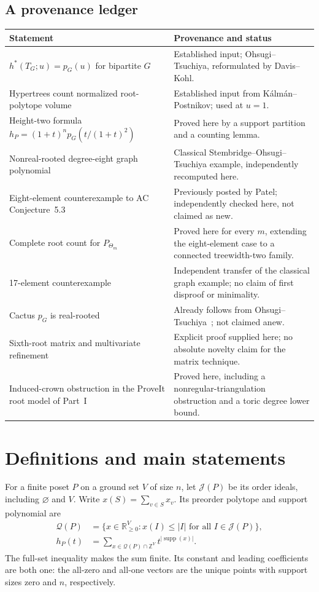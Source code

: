 \documentclass[11pt]{article}
\numberwithin{equation}{section}
\theoremstyle{definition}
\newcommand{\R}{\mathbb R}
\newcommand{\Z}{\mathbb Z}
\newcommand{\supp}{\operatorname{supp}}
\newcommand{\Qp}{\mathcal Q(P)}
\begin{document}
\subsection{A provenance ledger}

\begin{center}
\small
\begin{tabularx}{\textwidth}{@{}p{}Y@{}}
\toprule
Statement & Provenance and status\\
\midrule
$h^*(T_G;u)=p_G(u)$ for bipartite $G$ & Established input;
Ohsugi--Tsuchiya, reformulated by Davis--Kohl.\\
Hypertrees count normalized root-polytope volume & Established input from
K\'alm\'an--Postnikov; used at $u=1$.\\
Height-two formula $h_P=(1+t)^n p_G(t/(1+t)^2)$ & Proved here by a support
partition and a counting lemma.\\
Nonreal-rooted degree-eight graph polynomial & Classical
Stembridge--Ohsugi--Tsuchiya example, independently recomputed here.\\
Eight-element counterexample to AC Conjecture~5.3 & Previously posted by
Patel; independently checked here, not claimed as new.\\
Complete root count for $P_{\Theta_m}$ & Proved here for every $m$, extending
the eight-element case to a connected treewidth-two family.\\
17-element counterexample & Independent transfer of the classical graph
example; no claim of first disproof or minimality.\\
Cactus $p_G$ is real-rooted & Already follows from
Ohsugi--Tsuchiya~\cite[Theorem~7.2]{OT21}; not claimed anew.\\
Sixth-root matrix and multivariate refinement & Explicit proof supplied
here; no absolute novelty claim for the matrix technique.\\
Induced-crown obstruction in the ProveIt root model of Part~I & Proved here, including
a nonregular-triangulation obstruction and a toric degree lower bound.\\
\bottomrule
\end{tabularx}
\end{center}

\section{Definitions and main statements}\label{htwo:sec:definitions}

For a finite poset $P$ on a ground set $V$ of size $n$, let $\mathcal J(P)$
be its order ideals, including $\varnothing$ and $V$. Write
$x(S)=\sum_{v\in S}x_v$. Its preorder polytope and support polynomial are
\begin{align}
 \Qp&=\{x\in\R_{\ge0}^{V}:x(I)\le |I|\text{ for all }I\in\mathcal J(P)\},
 \label{htwo:eq:preorderpoly}\\
 h_P(t)&=\sum_{x\in\Qp\cap\Z^V}t^{|\supp(x)|}.\label{htwo:eq:supportpoly}
\end{align}
The full-set inequality makes the sum finite. Its constant and leading
coefficients are both one: the all-zero and all-one vectors are the unique
points with support sizes zero and $n$, respectively.
\end{document}
